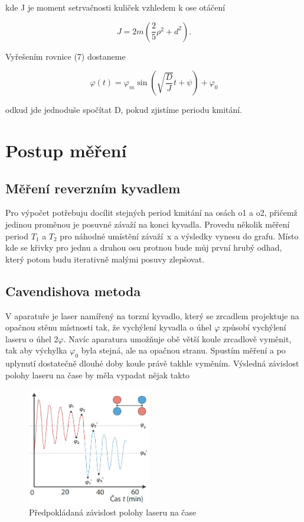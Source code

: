 \documentclass[a4paper,11pt]{article}
\begin{document}
\noindent
kde J je moment setrvačnosti kuliček vzhledem k ose otáčení

\begin{equation}
J = 2m ( \frac{2}{5} \rho^2 + d^2).
\end{equation}

Vyřešením rovnice (7) dostaneme

\begin{equation}
\varphi(t) = \varphi_m \sin(\sqrt{\frac{D}{J}}  t  + \psi) + \varphi_0
\end{equation}

\noindent
odkud jde jednoduše spočítat D, pokud zjistíme periodu kmitání.

\section{Postup měření}

\subsection{Měření reverzním kyvadlem}

Pro výpočet potřebuju docílit stejných period kmitání na osách o1 a o2, přičemž jedinou proměnou je posuvné závaží na konci kyvadla. Provedu několik měření period $T_1$ a $T_2$ pro náhodné umístění závaží~x a výsledky vynesu do grafu. Místo kde se křivky pro jednu a druhou osu protnou bude můj první hrubý odhad, který potom budu iterativně malými posuvy zlepšovat.

\subsection{Cavendishova metoda}

V aparatuře je laser namířený na torzní kyvadlo, který se zrcadlem projektuje na opačnou stěnu místnosti tak, že vychýlení kyvadla o úhel $\varphi$ způsobí  vychýlení laseru o úhel 2$\varphi$. Navíc aparatura umožňuje obě větší koule zrcadlově vyměnit, tak aby výchylka $\varphi_0$ byla stejná, ale na opačnou stranu. Spustím měření a po uplynutí dostatečně dlouhé doby koule právě takhle vyměním. Výsledná závislost polohy laseru na čase by měla vypadat nějak takto

\begin{figure}[htpb]
  \centering
  \includegraphics[width=0.48\textwidth]{cavendish_demo_mereni.jpg}
  \caption{Předpokládaná závislost polohy laseru na čase}
\end{figure}
\end{document}
